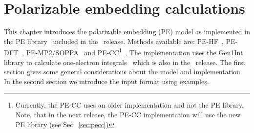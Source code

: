 \chapter{Polarizable embedding calculations}\label{ch:embedding}

This chapter introduces the polarizable embedding (PE) model as implemented in the PE library~\cite{pelib2012} included in the 
\latestrelease\ release. Methods available are: PE-HF~\cite{pescf}, 
PE-DFT~\cite{pescf}, PE-MP2/SOPPA~\cite{pesoppa} and 
PE-CC\footnote{Currently, the PE-CC uses an older implementation 
and not the PE 
library. Note, that in the next release, the PE-CC
implementation will use the new PE library (see Sec.~\ref{sec:pecc})}~\cite{pecc}. 
The implementation uses the Gen1Int library to calculate one-electron
integrals~\cite{gen1int} which is also in the \latestrelease\ release. The
first section gives some general considerations about the model and 
implementation. In the second section we introduce the input format using
examples.

\begin{center}
\end{center}

